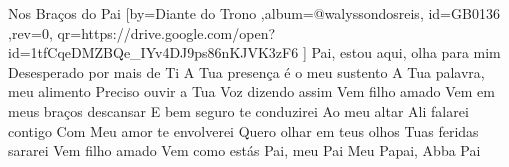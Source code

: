 \beginsong
{Nos Braços do Pai %
}[by={Diante do Trono %
},album={@walyssondosreis},
id={GB0136 %
},rev={0}, %
qr={https://drive.google.com/open?id=1tfCqeDMZBQe_IYv4DJ9ps86nKJVK3zF6 %
}]
\beginverse*
Pai, estou aqui, olha para mim
Desesperado por mais de Ti
\endverse
\beginverse*
A Tua presença é o meu sustento
A Tua palavra, meu alimento
Preciso ouvir a Tua Voz dizendo assim
\endverse
\beginchorus
Vem filho amado
Vem em meus braços descansar
E bem seguro te conduzirei
Ao meu altar
Ali falarei contigo
Com Meu amor te envolverei
Quero olhar em teus olhos
Tuas feridas sararei
Vem filho amado
Vem como estás
\endchorus
\beginverse*
Pai, meu Pai
Meu Papai, Abba Pai
\endverse

